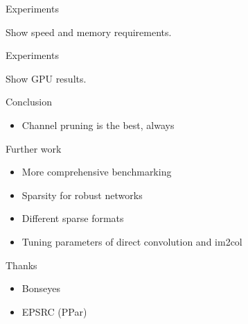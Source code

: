 \documentclass[xcolor=dvipsnames]{beamer}
\begin{document}
\begin{frame}{Experiments}
    
    Show speed and memory requirements.
    
\end{frame}



\begin{frame}{Experiments}
    
    Show GPU results.

    
\end{frame}








\begin{frame}{Conclusion}
    
    \begin{itemize}
        \item Channel pruning is the best, always
    \end{itemize}
    
\end{frame}


\begin{frame}{Further work}
\begin{itemize}
    \item More comprehensive benchmarking 
    \item Sparsity for robust networks
    \item Different sparse formats 
    \item Tuning parameters of direct convolution and im2col
\end{itemize}
\end{frame}

\begin{frame}{Thanks}
    \begin{itemize}
        \item Bonseyes
        \item EPSRC (PPar)
    \end{itemize}
\end{frame}
\end{document}
